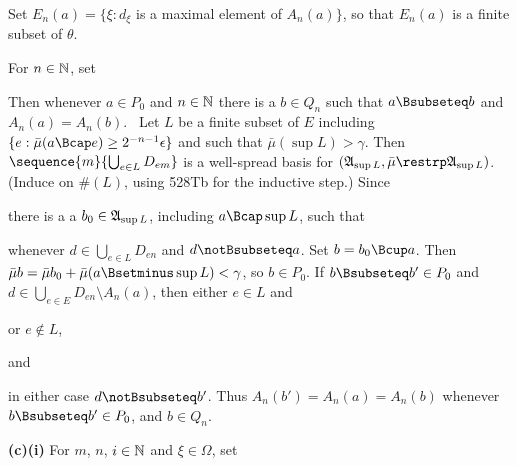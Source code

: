 {Set $E_n(a)=\{\xi:d_{\xi}$ is a maximal element of $A_n(a)\}$, so that
$E_n(a)$ is a finite subset of $\theta$.

\medskip

 For $n\in\Bbb N$, set


\noindent Then whenever $a\in P_0$ and $n\in\Bbb N$ there is a
$b\in Q_n$ such that $a\Bsubseteq b$ and $A_n(a)=A_n(b)$.
\Prf\ Let $L$ be a finite subset of $E$ including
$\{e:\bar\mu(a\Bcap e)\ge 2^{-n-1}\epsilon\}$ and such that
$\bar\mu(\sup L)>\gamma$.   Then
$\sequence{m}{\bigcup_{e\in L}D_{em}}$ is a well-spread basis for
$(\frak A_{\sup L},\bar\mu\restrp\frak A_{\sup L})$.   (Induce on $\#(L)$,
using 528Tb for the inductive step.)   Since


\noindent there is a a $b_0\in\frak A_{\sup L}$, including $a\Bcap\sup L$,
such that


\noindent whenever $d\in\bigcup_{e\in L}D_{en}$ and $d\notBsubseteq a$.
Set $b=b_0\Bcup a$.   Then
$\bar\mu b=\bar\mu b_0+\bar\mu(a\Bsetminus\sup L)<\gamma$, so
$b\in P_0$.   If $b\Bsubseteq b'\in P_0$ and
$d\in\bigcup_{e\in E}D_{en}\setminus A_n(a)$, then either $e\in L$ and


\noindent or $e\notin L$,


\noindent and


\noindent in either case $d\notBsubseteq b'$.
Thus $A_n(b')=A_n(a)=A_n(b)$ whenever
$b\Bsubseteq b'\in P_0$, and $b\in Q_n$.\ \Qed

\medskip

{\bf (c)(i)} For $m$, $n$, $i\in\Bbb N$ and $\xi\in\Omega$, set


}
